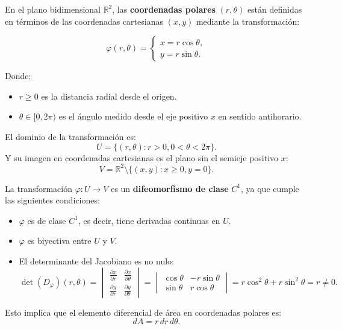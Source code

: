     \begin{definición}
    En el plano bidimensional $\mathbb{R}^2$, las \textbf{coordenadas polares} $(r, \theta)$ están definidas en términos de las coordenadas cartesianas $(x, y)$ mediante la transformación:
    
    \begin{minipage}{0.5\textwidth}
        \[
            \varphi(r, \theta) =
            \begin{cases}
                x = r\cos\theta, \\
                y = r\sin\theta.
            \end{cases}
        \]
    \end{minipage}
    \begin{minipage}{0.5\textwidth}
        \centering
        
    \end{minipage}
    
    Donde:
    \begin{itemize}
        \item $r \geq 0$ es la distancia radial desde el origen.
        \item $\theta \in [0, 2\pi)$ es el ángulo medido desde el eje positivo $x$ en sentido antihorario.
    \end{itemize}
    
    El dominio de la transformación es: $$ U = \{(r, \theta) : r > 0, 0 < \theta <
        2\pi\}. $$ Y su imagen en coordenadas cartesianas es el plano sin el semieje
    positivo $x$: $$ V = \mathbb{R}^2 \setminus \{ (x,y) : x \geq 0, y = 0\}. $$
    
    La transformación $\varphi: U \to V$ es un \textbf{difeomorfismo de clase}
    $C^1$, ya que cumple las siguientes condiciones:
    \begin{itemize}
        \item $\varphi$ es de clase $C^1$, es decir, tiene derivadas continuas en $U$.
        \item $\varphi$ es biyectiva entre $U$ y $V$.
        \item El determinante del Jacobiano es no nulo: $$ \det(D_{\varphi})(r, \theta) = \begin{vmatrix}
            \frac{\partial x}{\partial r} & \frac{\partial x}{\partial \theta} \\
            \frac{\partial y}{\partial r} & \frac{\partial y}{\partial \theta}
        \end{vmatrix} =
                  \begin{vmatrix}
                      \cos\theta & -r\sin\theta \\
                      \sin\theta & r\cos\theta
                  \end{vmatrix} = r\cos^2\theta + r\sin^2\theta = r \neq 0.
              $$
    \end{itemize}
    Esto implica que el elemento diferencial de área en coordenadas polares es:
    $$
        dA = r \, dr \, d\theta.
    $$
    \end{definición}
    
